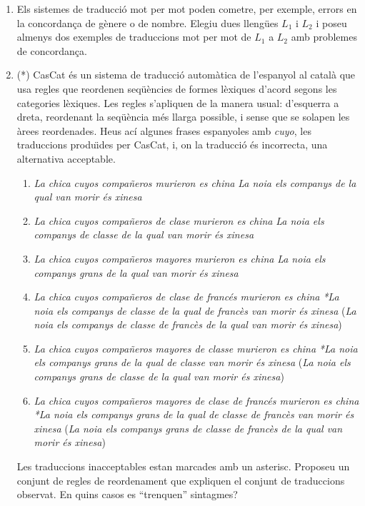 \begin{enumerate}
\item Els sistemes de traducció mot per mot poden cometre, per
  exemple, errors en la concordança de gènere o de nombre.  Elegiu
  dues llengües $L_1$ i $L_2$ i poseu almenys dos exemples de
  traduccions mot per mot de $L_1$ a $L_2$ amb problemes de
  concordança.

\item (*) \label{ex:cascat} CasCat és un sistema de traducció
  automàtica de l'espanyol al català que usa regles que reordenen
  seqüències de formes lèxiques d'acord segons les categories
  lèxiques. Les regles s'apliquen de la manera usual: d'esquerra a
  dreta, reordenant la seqüència més llarga possible, i sense que se
  solapen les àrees reordenades.  Heus ací algunes frases espanyoles
  amb {\em cuyo}, les traduccions produ\"{\i}des per CasCat, i, on la
  traducció és incorrecta, una alternativa acceptable.
  \begin{enumerate}
  \item \emph{La chica cuyos compañeros murieron es china} \newline
    {\em La noia els companys de la qual van morir és xinesa}
  \item \emph{La chica cuyos compañeros de clase murieron es china}
    \newline \emph{La noia els companys de classe de la qual van morir
      és xinesa}
  \item \emph{La chica cuyos compañeros mayores murieron es china}
    \newline \emph{La noia els companys grans de la qual van morir és
      xinesa}
  \item \emph{La chica cuyos compañeros de clase de francés murieron
      es china} \newline \emph{*La noia els companys de classe de la
      qual de francès van morir és xinesa} \newline (\emph{La noia els
      companys de classe de francès de la qual van morir és xinesa})
  \item \emph{La chica cuyos compañeros mayores de classe murieron es
      china} \newline \emph{*La noia els companys grans de la qual de
      classe van morir és xinesa} \newline (\emph{La noia els companys
      grans de classe de la qual van morir és xinesa})
  \item \emph{La chica cuyos compañeros mayores de clase de francés
      murieron es china} \newline \emph{*La noia els companys grans de
      la qual de classe de francès van morir és xinesa} \newline
    (\emph{La noia els companys grans de classe de francès de la qual
      van morir és xinesa})
  \end{enumerate}
  Les traduccions inacceptables estan marcades amb un asterisc.
  Proposeu un conjunt de regles de reordenament que expliquen el
  conjunt de traduccions observat. En quins casos es ``trenquen''
  sintagmes?


\end{enumerate}
